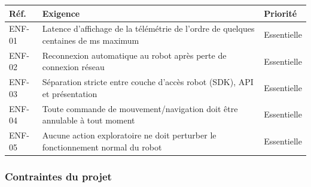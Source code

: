 \begin{center}
\begin{tabular}{|p{}|p{}|p{}|}
\hline
\textbf{Réf.} & \textbf{Exigence} & \textbf{Priorité} \\
\hline
ENF-01 & Latence d'affichage de la télémétrie de l'ordre de quelques centaines
de ms maximum & Essentielle \\
\hline
ENF-02 & Reconnexion automatique au robot après perte de connexion réseau &
Essentielle \\
\hline
ENF-03 & Séparation stricte entre couche d'accès robot (SDK), API et présentation
& Essentielle \\
\hline
ENF-04 & Toute commande de mouvement/navigation doit être annulable à tout moment
& Essentielle \\
\hline
ENF-05 & Aucune action exploratoire ne doit perturber le fonctionnement normal
du robot & Essentielle \\
\hline
\end{tabular}
\label{tab:besoins_non_fonctionnels}
\end{center}

\subsubsection{Contraintes du projet}

